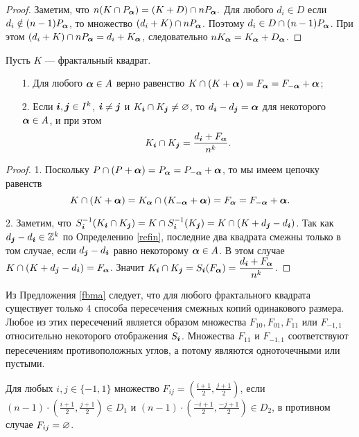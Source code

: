 \begin{proof}
Заметим, что $n(K\cap P_{\bm{\alpha}})=(K+D)\cap nP_{\bm{\alpha}}.$ 
Для любого $d_i\in D$ если $d_i\notin(n-1)P_{\bm{\alpha}}$, то множество $(d_i+K)\cap nP_{\bm{\alpha}}$.
Поэтому $d_i\in D\cap (n-1)P_{\bm{\alpha}}$. 
При этом $(d_i+K)\cap nP_{\bm{\alpha}}=d_i+K_{\bm{\alpha}}$, следовательно $n K_{\bm{\alpha}}={K_{\bm{\alpha}}+D_{\bm{\alpha}}}$.
\end{proof}



\begin{proposition}\label{fbma}
Пусть $K$ --- фрактальный квадрат.
\begin{itemize}[nolistsep]
\item[1.] Для любого ${\bm{\alpha}}\in A$ верно равенство $K\cap(K+{\bm{\alpha}})=F_{\bm{\alpha}}=F_{-{\bm{\alpha}}}+{\bm{\alpha}} $;
\item[2.] Если ${\bm{i}},{\bm{j}} \in I^k$, ${\bm{i}}\neq {\bm{j}}$ и $K_{\bm{i}}\cap K_{\bm{j}}\neq\varnothing$, то $d_{\bm{i}}-d_{\bm{j}}={\bm{\alpha}}$ для некоторого ${\bm{\alpha}}\in A$, и при этом 
$$K_{\bm{i}}\cap K_{\bm{j}}=\dfrac{d_{\bm{i}}+F_{\bm{\alpha}}}{n^k}.$$
\end{itemize}
\end{proposition}

\begin{proof}
1. Поскольку $P\cap (P+{\bm{\alpha}})=P_{\bm{\alpha}}=P_{-{\bm{\alpha}}}+{\bm{\alpha}}$, то мы имеем цепочку равенств 
$$K\cap(K+{\bm{\alpha}})= K_{\bm{\alpha}}\cap (K_{-{\bm{\alpha}}}+{\bm{\alpha}})=F_{\bm{\alpha}}=F_{-{\bm{\alpha}}}+{\bm{\alpha}}.$$

2. Заметим, что $S_{\bm{i}}^{-1}(K_{\bm{i}}\cap K_{\bm{j}})=K\cap S_{\bm{i}}^{-1}(K_{\bm{j}})=K\cap (K+d_{\bm{j}}-d_{\bm{i}})$. 
Так как $d_{\bm{j}}-d_{\bm{i}}\in\mathbb{Z}^k$ по Определению \ref{refin}, последние два квадрата смежны только в том случае, если $d_{\bm{j}}-d_{\bm{i}}$ равно некоторому ${\bm{\alpha}}\in A$. 
В этом случае $K\cap(K+d_{\bm{j}}-d_{\bm{i}})=F_{\bm{\alpha}}$.
Значит $K_{\bm{i}}\cap K_{\bm{j}}= S_{\bm{i}}(F_{\bm{\alpha}})= \dfrac{d_{\bm{i}}+F_{\bm{\alpha}}}{n^k}$. 
\end{proof}

Из Предложения \ref{fbma} следует, что для любого фрактального квадрата существует только $4$ способа пересечения смежных копий одинакового размера. 
Любое из этих пересечений является образом множества $F_{10}, F_{01}, F_{11}$ или $ F_{-1,1}$ относительно некоторого отображения $S_{\bm{i}}$. 
Множества $F_{11}$ и $ F_{-1,1}$ соответствуют пересечениям противоположных углов, а потому являются одноточечными или пустыми. 

Для любых $i,j\in\{-1,1\}$ множество $F_{ij}=\left(\frac{i+1}{2},\frac{j+1}{2}\right)$, если $(n-1)\cdot\left(\frac{i+1}{2},\frac{j+1}{2}\right)\in D_1$ и $(n-1)\cdot\left(\frac{-i+1}{2},\frac{-j+1}{2}\right)\in D_2$, в противном случае $F_{ij}=\varnothing$. 


